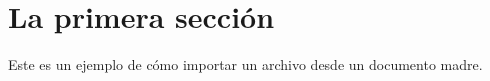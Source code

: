 \section{La primera sección}

Este es un ejemplo de cómo importar un archivo desde un documento madre.